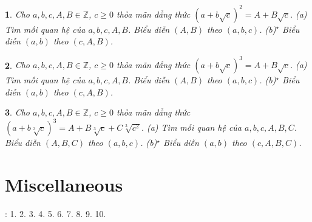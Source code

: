 \documentclass{article}
\newtheorem{baitoan}{}
\begin{document}
\begin{baitoan}
	Cho $a,b,c,A,B\in\mathbb{Z}$, $c\ge0$ thỏa mãn đẳng thức $(a + b\sqrt{c})^2 = A + B\sqrt{c}$. (a) Tìm mối quan hệ của $a,b,c,A,B$. Biểu diễn $(A,B)$ theo $(a,b,c)$. (b)${}^\star$ Biểu diễn $(a,b)$ theo $(c,A,B)$.
\end{baitoan}

\begin{baitoan}
	Cho $a,b,c,A,B\in\mathbb{Z}$, $c\ge0$ thỏa mãn đẳng thức $(a + b\sqrt{c})^3 = A + B\sqrt{c}$. (a) Tìm mối quan hệ của $a,b,c,A,B$. Biểu diễn $(A,B)$ theo $(a,b,c)$. (b)${}^\star$ Biểu diễn $(a,b)$ theo $(c,A,B)$.
\end{baitoan}

\begin{baitoan}
	Cho $a,b,c,A,B\in\mathbb{Z}$, $c\ge0$ thỏa mãn đẳng thức $(a + b\sqrt[3]{c})^3 = A + B\sqrt[3]{c} + C\sqrt[3]{c^2}$. (a) Tìm mối quan hệ của $a,b,c,A,B,C$. Biểu diễn $(A,B,C)$ theo $(a,b,c)$. (b)${}^\star$ Biểu diễn $(a,b)$ theo $(c,A,B,C)$.
\end{baitoan}


\section{Miscellaneous}
\cite[BTCCIII, pp. 72--73]{SGK_Toan_9_Canh_Dieu_tap_1}: 1. 2. 3. 4. 5. 6. 7. 8. 9. 10.


\printbibliography[heading=bibintoc]
\end{document}
